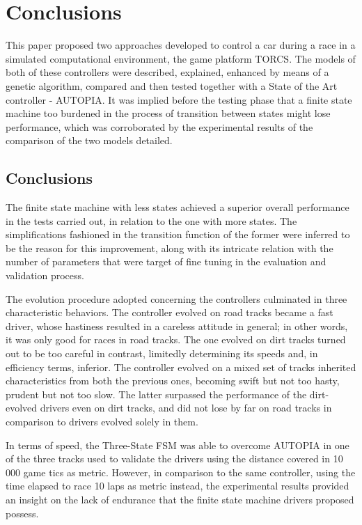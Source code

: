 \section{Conclusions} \label{sec:Conclusions}

	This paper proposed two approaches developed to control a car during a race in a simulated computational environment, the game platform TORCS. The models of both of these controllers were described, explained, enhanced by means of a genetic algorithm, compared and then tested together with a State of the Art controller - AUTOPIA. It was implied before the testing phase that a finite state machine too burdened in the process of transition between states might lose performance, which was corroborated by the experimental results of the comparison of the two models detailed.
		
\subsection{Conclusions} \label{subsec:Conclusions}

	The finite state machine with less states achieved a superior overall performance in the tests carried out, in relation to the one with more states. The simplifications fashioned in the transition function of the former were inferred to be the reason for this improvement, along with its intricate relation with the number of parameters that were target of fine tuning in the evaluation and validation process.
	
	The evolution procedure adopted concerning the controllers culminated in three characteristic behaviors. The controller evolved on road tracks became a fast driver, whose hastiness resulted in a careless attitude in general; in other words, it was only good for races in road tracks. The one evolved on dirt tracks turned out to be too careful in contrast, limitedly determining its speeds and, in efficiency terms, inferior. The controller evolved on a mixed set of tracks inherited characteristics from both the previous ones, becoming swift but not too hasty, prudent but not too slow. The latter surpassed the performance of the dirt-evolved drivers even on dirt tracks, and did not lose by far on road tracks in comparison to drivers evolved solely in them.
	
	In terms of speed, the Three-State FSM was able to overcome AUTOPIA in one of the three tracks used to validate the drivers using the distance covered in 10 000 game tics as metric. However, in comparison to the same controller, using the time elapsed to race 10 laps as metric instead, the experimental results provided an insight on the lack of endurance that the finite state machine drivers proposed possess.
	
